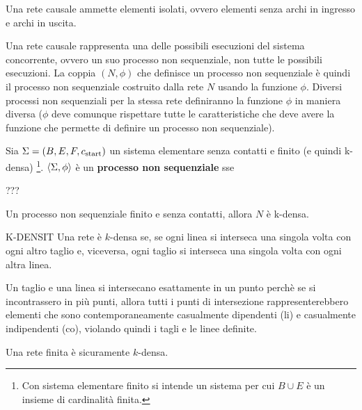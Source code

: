 \begin{rem}
    Una rete causale ammette elementi isolati, ovvero elementi senza archi in ingresso e archi in uscita.
\end{rem}

Una rete causale rappresenta una delle possibili esecuzioni del sistema concorrente, ovvero un suo processo non sequenziale, non tutte le possibili esecuzioni. La coppia $(N, \phi)$ che definisce un processo non sequenziale è quindi il processo non sequenziale costruito dalla rete $N$ usando la funzione $\phi$. Diversi processi non sequenziali per la stessa rete definiranno la funzione $\phi$ in maniera diversa ($\phi$ deve comunque rispettare tutte le caratteristiche che deve avere la funzione che permette di definire un processo non sequenziale).

Sia $\Sigma = (B, E, F, c_{\textnormal{start}})$ un sistema elementare senza contatti e finito (e quindi k-densa) \footnote{Con sistema elementare finito si intende un sistema per cui $B \cup E$ è un insieme di cardinalità finita.}.
$\left\langle\Sigma, \phi\right\rangle$ è un \textbf{processo non sequenziale} sse 

???

Un processo non sequenziale finito e senza contatti, allora $N$ è k-densa.

K-DENSIT
Una rete è $k$-densa se, se ogni linea si interseca una singola volta con ogni altro taglio e, viceversa, ogni taglio si interseca una singola volta con ogni altra linea.

Un taglio e una linea si intersecano esattamente in un punto perchè se si incontrassero in più punti, allora tutti i punti di intersezione rappresenterebbero elementi che sono contemporaneamente casualmente dipendenti (li) e casualmente indipendenti (co), violando quindi i tagli e le linee definite.

Una rete finita è sicuramente $k$-densa.




